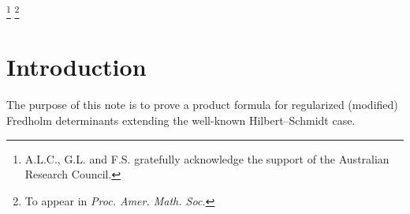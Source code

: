 \documentclass[reqno,10pt,centertags]{amsart}
\newcommand{\bbN}{{\mathbb{N}}}
\newcommand{\cB}{{\mathcal B}}
\newcommand{\cH}{{\mathcal H}}
\DeclareMathOperator{\tr}{tr}
\newcommand{\lb}{\label}
\let\geq\geqslant
\numberwithin{equation}{section}
\theoremstyle{remark}
\begin{document}
\date{\today}
\thanks{A.L.C., G.L. and F.S. gratefully acknowledge the support of the Australian Research Council.} 
\thanks{To appear in {\it Proc. Amer. Math. Soc.}}


\begin{abstract} 
For trace class operators $A, B \in \cB_1(\cH)$ ($\cH$ a complex, separable Hilbert space), the product formula for Fredholm determinants holds in the familiar form
\[
{\det}_{\cH} ((I_{\cH} - A) (I_{\cH} - B)) = {\det}_{\cH} (I_{\cH} - A) {\det}_{\cH} (I_{\cH} - B). 
\]
When trace class operators are replaced by Hilbert--Schmidt operators $A, B \in \cB_2(\cH)$ and the Fredholm determinant ${\det}_{\cH}(I_{\cH} - A)$, $A \in \cB_1(\cH)$, by the 2nd regularized Fredholm determinant 
${\det}_{\cH,2}(I_{\cH} - A) =  {\det}_{\cH} ((I_{\cH} - A) \exp(A))$, $A \in \cB_2(\cH)$, the product formula must be replaced by 
\begin{align*} 
{\det}_{\cH,2} ((I_{\cH} - A) (I_{\cH} - B)) &= {\det}_{\cH,2} (I_{\cH} - A) {\det}_{\cH,2} (I_{\cH} - B)   \\
& \quad \times \exp(- \tr_{\cH}(AB)).     
\end{align*}
The product formula for the case of higher regularized Fredholm determinants ${\det}_{\cH,k}(I_{\cH} - A)$, 
$A \in \cB_k(\cH)$, $k \in \bbN$, $k \geq 2$, does not seem to be easily accessible and hence this note aims at filling this gap in the literature. 
\end{abstract}

\maketitle




\section{Introduction} \lb{s1} 

The purpose of this note is to prove a product formula for regularized (modified) Fredholm determinants extending the well-known Hilbert--Schmidt case.
\end{document}
